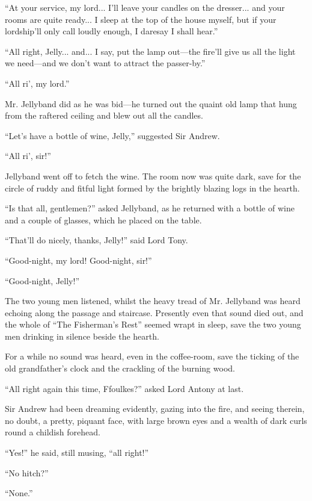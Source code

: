 \documentclass[paper=a5,BCOR=7mm,twoside,DIV=calc,12pt,usegeometry,chapterprefix,endperiod,headings=big]{scrbook}
\begin{document}
\enquote{At your service, my lord... I'll leave your candles on the dresser... and your rooms are quite ready... I sleep at the top of the house myself, but if your lordship'll only call loudly enough, I daresay I shall hear.}

\enquote{All right, Jelly... and... I say, put the lamp out---the fire'll give us all the light we need---and we don't want to attract the passer-by.}

\enquote{All ri’, my lord.}

Mr. Jellyband did as he was bid---he turned out the quaint old lamp that hung from the raftered ceiling and blew out all the candles.

\enquote{Let's have a bottle of wine, Jelly,} suggested Sir Andrew.

\enquote{All ri’, sir!}

Jellyband went off to fetch the wine. The room now was quite dark, save for the circle of ruddy and fitful light formed by the brightly blazing logs in the hearth.

\enquote{Is that all, gentlemen?} asked Jellyband, as he returned with a bottle of wine and a couple of glasses, which he placed on the table.

\enquote{That'll do nicely, thanks, Jelly!} said Lord Tony.

\enquote{Good-night, my lord! Good-night, sir!}

\enquote{Good-night, Jelly!}

The two young men listened, whilst the heavy tread of Mr. Jellyband was heard echoing along the passage and staircase. Presently even that sound died out, and the whole of \enquote{The Fisherman's Rest} seemed wrapt in sleep, save the two young men drinking in silence beside the hearth.

For a while no sound was heard, even in the coffee-room, save the ticking of the old grandfather's clock and the crackling of the burning wood.

\enquote{All right again this time, Ffoulkes?} asked Lord Antony at last.

Sir Andrew had been dreaming evidently, gazing into the fire, and seeing therein, no doubt, a pretty, piquant face, with large brown eyes and a wealth of dark curls round a childish forehead.

\enquote{Yes!} he said, still musing, \enquote{all right!}

\enquote{No hitch?}

\enquote{None.}
\end{document}
